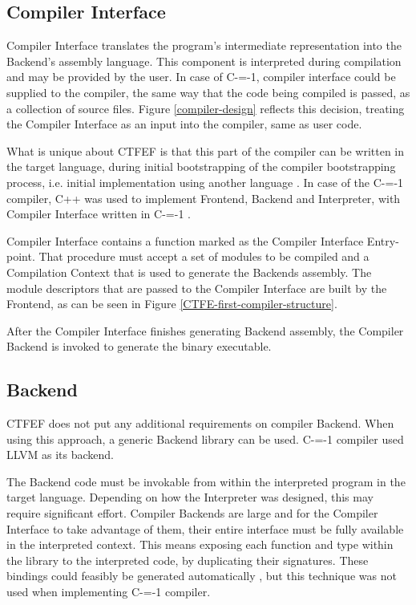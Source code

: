 \subsection{Compiler Interface}
\label{compiler-interface}

Compiler Interface translates the program's intermediate representation into the Backend's assembly language.
This component is interpreted during compilation and may be provided by the user.
In case of C-=-1, compiler interface could be supplied to the compiler, the same way that the code being compiled is passed, as a collection of source files.
Figure \ref{compiler-design} reflects this decision, treating the Compiler Interface as an input into the compiler, same as user code.

What is unique about CTFEF is that this part of the compiler can be written in the target language, during initial bootstrapping of the compiler bootstrapping process, i.e. initial implementation using another language \cite{puntambekar:compiler_design, novillo2007gcc}.
In case of the C-=-1 compiler, C++ was used to implement Frontend, Backend and Interpreter, with Compiler Interface written in C-=-1 \cite{grabski2022compilation}.

Compiler Interface contains a function marked as the Compiler Interface Entry-point.
That procedure must accept a set of modules to be compiled and a Compilation Context that is used to generate the Backends assembly.
The module descriptors that are passed to the Compiler Interface are built by the Frontend, as can be seen in Figure \ref{CTFE-first-compiler-structure}.

After the Compiler Interface finishes generating Backend assembly, the Compiler Backend is invoked to generate the binary executable.
\subsection{Backend}
\label{Backend}

CTFEF does not put any additional requirements on compiler Backend.
When using this approach, a generic Backend library can be used.
C-=-1 compiler used LLVM\cite{lattner2008llvm} as its backend.

The Backend code must be invokable from within the interpreted program in the target language.
Depending on how the Interpreter was designed, this may require significant effort. %
Compiler Backends are large and for the Compiler Interface to take advantage of them, their entire interface must be fully available in the interpreted context.
This means exposing each function and type within the library to the interpreted code, by duplicating their signatures.
These bindings could feasibly be generated automatically \cite{marshalling_auto_generation}, but this technique was not used when implementing C-=-1 compiler.
